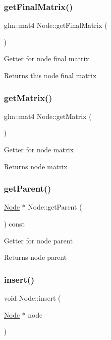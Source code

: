 \subsubsection{\texorpdfstring{get\+Final\+Matrix()}{getFinalMatrix()}}
{\footnotesize\ttfamily glm\+::mat4 Node\+::get\+Final\+Matrix (\begin{DoxyParamCaption}{ }\end{DoxyParamCaption})}

Getter for node final matrix \begin{DoxyReturn}{Returns}
this node final matrix 
\end{DoxyReturn}
\mbox{\label{classNode_a114b338b42c09c85698b4642f1c81215}} 
\subsubsection{\texorpdfstring{get\+Matrix()}{getMatrix()}}
{\footnotesize\ttfamily glm\+::mat4 Node\+::get\+Matrix (\begin{DoxyParamCaption}{ }\end{DoxyParamCaption})}

Getter for node matrix \begin{DoxyReturn}{Returns}
node matrix 
\end{DoxyReturn}
\mbox{\label{classNode_a3cad655320d50751c43c5cec9356dcf3}} 
\subsubsection{\texorpdfstring{get\+Parent()}{getParent()}}
{\footnotesize\ttfamily \hyperlink{classNode}{Node} $\ast$ Node\+::get\+Parent (\begin{DoxyParamCaption}{ }\end{DoxyParamCaption}) const}

Getter for node parent \begin{DoxyReturn}{Returns}
node parent 
\end{DoxyReturn}
\mbox{\label{classNode_a9445bb4d5ae1ef69ab32d3d2780d0082}} 
\subsubsection{\texorpdfstring{insert()}{insert()}}
{\footnotesize\ttfamily void Node\+::insert (\begin{DoxyParamCaption}\item[{\hyperlink{classNode}{Node} $\ast$}]{node }\end{DoxyParamCaption})}


